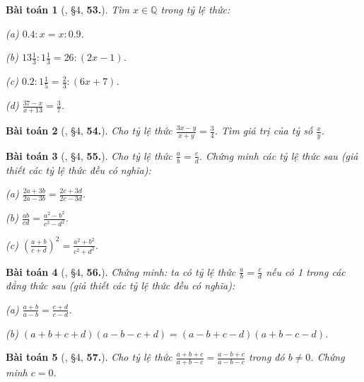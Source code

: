 \documentclass{article}
\numberwithin{equation}{section}
\newtheorem{baitoan}{Bài toán}
\begin{document}
\begin{baitoan}[\cite{Binh_Toan_7_tap_1}, \S4, \textbf{53.}]
	Tìm $x\in\mathbb{Q}$ trong tỷ lệ thức:
	\begin{enumerate*}
		\item[(a)] $0.4:x = x:0.9$.
		\item[(b)] $13\frac{1}{3}:1\frac{1}{3} = 26:(2x - 1)$.
		\item[(c)] $0.2:1\frac{1}{5} = \frac{2}{3}:(6x + 7)$.
		\item[(d)] $\frac{37 - x}{x + 13} = \frac{3}{7}$.
	\end{enumerate*}
\end{baitoan}

\begin{baitoan}[\cite{Binh_Toan_7_tap_1}, \S4, \textbf{54.}]
	Cho tỷ lệ thức $\frac{3x - y}{x + y} = \frac{3}{4}$. Tìm giá trị của tỷ số $\frac{x}{y}$.
\end{baitoan}

\begin{baitoan}[\cite{Binh_Toan_7_tap_1}, \S4, \textbf{55.}]
	Cho tỷ lệ thức $\frac{a}{b} = \frac{c}{d}$. Chứng minh các tỷ lệ thức sau (giả thiết các tỷ lệ thức đều có nghĩa):
	\begin{enumerate*}
		\item[(a)] $\frac{2a + 3b}{2a - 3b} = \frac{2c + 3d}{2c - 3d}$.
		\item[(b)] $\frac{ab}{cd} = \frac{a^2 - b^2}{c^2 - d^2}$.
		\item[(c)] $\left(\frac{a + b}{c + d}\right)^2 = \frac{a^2 + b^2}{c^2 + d^2}$.
	\end{enumerate*}
\end{baitoan}

\begin{baitoan}[\cite{Binh_Toan_7_tap_1}, \S4, \textbf{56.}]
	Chứng minh: ta có tỷ lệ thức $\frac{a}{b} = \frac{c}{d}$ nếu có 1 trong các đẳng thức sau (giả thiết các tỷ lệ thức đều có nghĩa):
	\begin{enumerate*}
		\item[(a)] $\frac{a + b}{a - b} = \frac{c + d}{c - d}$.
		\item[(b)] $(a + b + c + d)(a - b - c + d) = (a - b + c - d)(a + b - c - d)$.
	\end{enumerate*}
\end{baitoan}

\begin{baitoan}[\cite{Binh_Toan_7_tap_1}, \S4, \textbf{57.}]
	Cho tỷ lệ thức $\frac{a + b + c}{a + b - c} = \frac{a - b + c}{a - b - c}$ trong đó $b\ne 0$. Chứng minh $c = 0$.
\end{baitoan}
\end{document}
